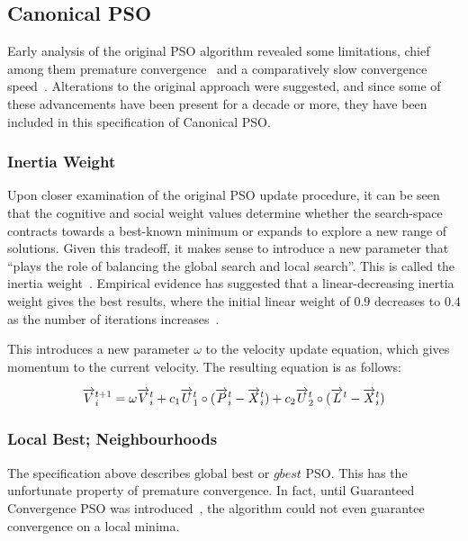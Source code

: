 \documentclass{csfourzero}
\newcommand{\rarrow}[1]{\overrightarrow{#1\vphantom{b}}}
\begin{document}
\subsection{Canonical PSO}

Early analysis of the original PSO algorithm revealed some limitations, chief
among them premature convergence~\cite{vandenBergh:2002tk} and a comparatively
slow convergence speed~\cite{Shi:1998kl}. Alterations to the original approach
were suggested, and since some of these advancements have been present for a
decade or more, they have been included in this specification of Canonical
PSO\@.

\subsubsection{Inertia Weight}

Upon closer examination of the original PSO update procedure, it can be seen
that the cognitive and social weight values determine whether the search-space
contracts towards a best-known minimum or expands to explore a new range of
solutions. Given this tradeoff, it makes sense to introduce a new parameter that
``plays the role of balancing the global search and local search''. This is
called the inertia weight~\cite{Shi:1998kl}. Empirical evidence has suggested
that a linear-decreasing inertia weight gives the best results, where the
initial linear weight of $0.9$ decreases to $0.4$ as the number of iterations
increases~\cite{Shi:1998jj}.

This introduces a new parameter $\omega$ to the velocity update equation, which
gives momentum to the current velocity. The resulting equation is as follows:

\begin{equation} \label{eq:canon_v_update}
\rarrow{V}_i^{t+1} = \omega \rarrow{V}_i^t + c_1 \rarrow{U}_1^t \circ (\rarrow{P}_i^t - \rarrow{X}_i^t) + c_2 \rarrow{U}^t_2 \circ (\rarrow{L}^t - \rarrow{X}_i^t)
\end{equation}

\subsubsection{Local Best; Neighbourhoods}

The specification above describes $\text{global best}$ or $gbest$ PSO\@. This
has the unfortunate property of premature convergence. In fact, until Guaranteed
Convergence PSO was introduced~\cite{vandenBergh:2002tk}, the algorithm could
not even guarantee convergence on a local minima.
\end{document}
